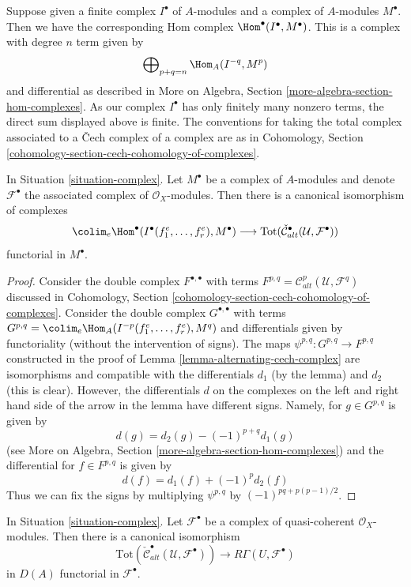 \noindent
Suppose given a finite complex $I^\bullet$ of $A$-modules and a
complex of $A$-modules $M^\bullet$. Then we have the corresponding
Hom complex $\Hom^\bullet(I^\bullet, M^\bullet)$. This is a complex
with degree $n$ term given by
$$
\bigoplus\nolimits_{p + q = n} \Hom_A(I^{-q}, M^p)
$$
and differential as described in More on Algebra, Section
\ref{more-algebra-section-hom-complexes}.
As our complex $I^\bullet$ has only finitely many nonzero terms, the
direct sum displayed above is finite.
The conventions for taking the total complex associated to a
{\v C}ech complex of a complex are as in
Cohomology, Section \ref{cohomology-section-cech-cohomology-of-complexes}.

\begin{lemma}
\label{lemma-alternating-cech-complex-complex}
In Situation \ref{situation-complex}. Let $M^\bullet$ be a
complex of $A$-modules and
denote $\mathcal{F}^\bullet$ the associated complex of
$\mathcal{O}_X$-modules. Then
there is a canonical isomorphism of complexes
$$
\colim_e \Hom^\bullet(I^\bullet(f_1^e, \ldots, f_r^e), M^\bullet)
\longrightarrow
\text{Tot}(\check{\mathcal{C}}_{alt}^\bullet(\mathcal{U}, \mathcal{F}^\bullet))
$$
functorial in $M^\bullet$.
\end{lemma}

\begin{proof}
Consider the double complex $F^{\bullet, \bullet}$ with terms
$F^{p, q} = \mathcal{C}_{alt}^p(\mathcal{U}, \mathcal{F}^q)$
discussed in
Cohomology, Section \ref{cohomology-section-cech-cohomology-of-complexes}.
Consider the double complex $G^{\bullet, \bullet}$ with terms
$G^{p, q} = \colim_e \Hom_A(I^{-p}(f_1^e, \ldots, f_r^e), M^q)$ and
differentials given by functoriality (without the intervention
of signs). The maps $\psi^{p, q} : G^{p, q} \to F^{p, q}$
constructed in the proof of Lemma \ref{lemma-alternating-cech-complex}
are isomorphisms and compatible with the differentials $d_1$ (by the lemma)
and $d_2$ (this is clear). However, the differentials $d$ on the
complexes on the left and right hand side of the arrow in the lemma
have different signs. Namely, for $g \in G^{p, q}$ is given by
$$
d(g) =  d_2(g) - (-1)^{p + q} d_1(g) 
$$
(see More on Algebra, Section \ref{more-algebra-section-hom-complexes})
and the differential for $f \in F^{p, q}$ is given by
$$
d(f) = d_1(f) + (-1)^p d_2(f)
$$
Thus we can fix the signs by multiplying $\psi^{p, q}$ by
$(-1)^{pq + p(p - 1)/2}$.
\end{proof}

\begin{lemma}
\label{lemma-alternating-cech-complex-complex-computes-cohomology}
In Situation \ref{situation-complex}. Let $\mathcal{F}^\bullet$
be a complex of quasi-coherent $\mathcal{O}_X$-modules. Then
there is a canonical isomorphism
$$
\text{Tot}(\check{\mathcal{C}}_{alt}^\bullet(\mathcal{U}, \mathcal{F}^\bullet))
\longrightarrow
R\Gamma(U, \mathcal{F}^\bullet)
$$
in $D(A)$ functorial in $\mathcal{F}^\bullet$.
\end{lemma}

